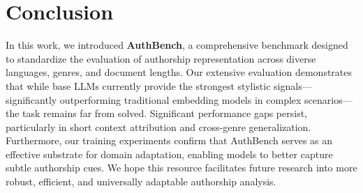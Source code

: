 \documentclass[11pt]{article}
\begin{document}


\section{Conclusion}
In this work, we introduced \textbf{AuthBench}, a comprehensive benchmark designed to standardize the evaluation of authorship representation across diverse languages, genres, and document lengths. Our extensive evaluation demonstrates that while base LLMs currently provide the strongest stylistic signals—significantly outperforming traditional embedding models in complex scenarios—the task remains far from solved. Significant performance gaps persist, particularly in short context attribution and cross-genre generalization. Furthermore, our training experiments confirm that AuthBench serves as an effective substrate for domain adaptation, enabling models to better capture subtle authorship cues. We hope this resource facilitates future research into more robust, efficient, and universally adaptable authorship analysis.
\end{document}
